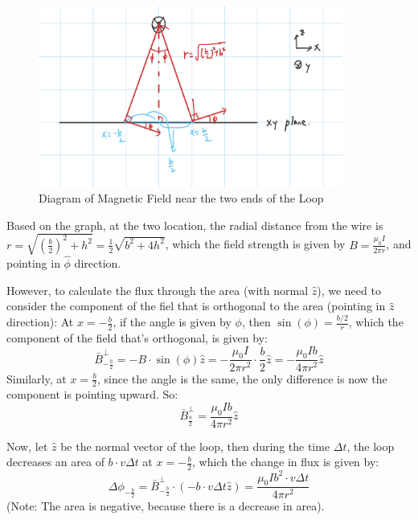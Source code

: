 \documentclass{article}
\begin{document}
\hfill

\begin{figure}[h!]
    \begin{center}
        \includegraphics*[width=100mm]{Diagram for magnetic field.jpg}
        \caption{Diagram of Magnetic Field near the two ends of the Loop}
    \end{center}
\end{figure}

Based on the graph, at the two location, the radial distance from the wire is $r=\sqrt{(\frac{b}{2})^2+h^2} = \frac{1}{2}\sqrt{b^2+4h^2}$,
which the field strength is given by $B=\frac{\mu_0I}{2\pi r}$, and pointing in $\hat{\phi}$ direction.

However, to calculate the flux through the area (with normal $\hat{z}$), we need to consider the component of the fiel that is orthogonal to the area (pointing in $\hat{z}$ direction):
At $x=-\frac{b}{2}$, if the angle is given by $\phi$, then $\sin(\phi)=\frac{b/2}{r}$, which the component of the field that's orthogonal, is given by:
$$\bar{B}^\perp_{-\frac{b}{2}}=-B\cdot \sin(\phi)\hat{z} = -\frac{\mu_0I}{2\pi r^2}\cdot \frac{b}{2}\hat{z} = -\frac{\mu_0Ib}{4\pi r^2}\hat{z}$$
Similarly, at $x=\frac{b}{2}$, since the angle is the same, the only difference is now the component is pointing upward. So:
$$\bar{B}^\perp_{\frac{b}{2}}=\frac{\mu_0Ib}{4\pi r^2}\hat{z}$$

\hfill

Now, let $\hat{z}$ be the normal vector of the loop, then during the time $\Delta t$, the loop decreases an area of $b\cdot v\Delta t$ at $x=-\frac{b}{2}$,
which the change in flux is given by:
$$\Delta\phi_{-\frac{b}{2}}=\bar{B}^\perp_{-\frac{b}{2}}\cdot\left(-b\cdot v\Delta t\hat{z}\right) = \frac{\mu_0Ib^2\cdot v\Delta t}{4\pi r^2}$$
(Note: The area is negative, because there is a decrease in area).
\end{document}
